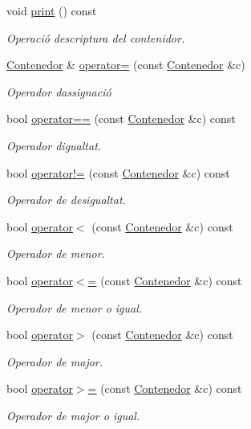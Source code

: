 \begin{DoxyCompactItemize}
void \hyperlink{class_contenedor_abcffc39995e62a9ddad113b2cfeb3279}{print} () const
\begin{DoxyCompactList}\small\item\em Operació d\textquotesingle{}escriptura del contenidor. \end{DoxyCompactList}\item 
\hyperlink{class_contenedor}{Contenedor} \& \hyperlink{class_contenedor_a4653bad34c7ff84820bf210306151be6}{operator=} (const \hyperlink{class_contenedor}{Contenedor} \&c)
\begin{DoxyCompactList}\small\item\em Operador d\textquotesingle{}assignació \end{DoxyCompactList}\item 
bool \hyperlink{class_contenedor_affecade7507a978e3abb5eea331a509e}{operator==} (const \hyperlink{class_contenedor}{Contenedor} \&c) const
\begin{DoxyCompactList}\small\item\em Operador d\textquotesingle{}igualtat. \end{DoxyCompactList}\item 
bool \hyperlink{class_contenedor_a740ea02e3530462a00f8a6ce18b2bf9c}{operator!=} (const \hyperlink{class_contenedor}{Contenedor} \&c) const
\begin{DoxyCompactList}\small\item\em Operador de desigualtat. \end{DoxyCompactList}\item 
bool \hyperlink{class_contenedor_a9d590c94118fcc15af16ba5a6be35d09}{operator$<$} (const \hyperlink{class_contenedor}{Contenedor} \&c) const
\begin{DoxyCompactList}\small\item\em Operador de menor. \end{DoxyCompactList}\item 
bool \hyperlink{class_contenedor_a587d437b6c6973c3b7008f579c4590a4}{operator$<$=} (const \hyperlink{class_contenedor}{Contenedor} \&c) const
\begin{DoxyCompactList}\small\item\em Operador de menor o igual. \end{DoxyCompactList}\item 
bool \hyperlink{class_contenedor_a9520b1def419e6d64e879ab5b594e3a8}{operator$>$} (const \hyperlink{class_contenedor}{Contenedor} \&c) const
\begin{DoxyCompactList}\small\item\em Operador de major. \end{DoxyCompactList}\item 
bool \hyperlink{class_contenedor_a7f95853ed98513ffc10c9213df656cfd}{operator$>$=} (const \hyperlink{class_contenedor}{Contenedor} \&c) const
\begin{DoxyCompactList}\small\item\em Operador de major o igual. \end{DoxyCompactList}\end{DoxyCompactItemize}



